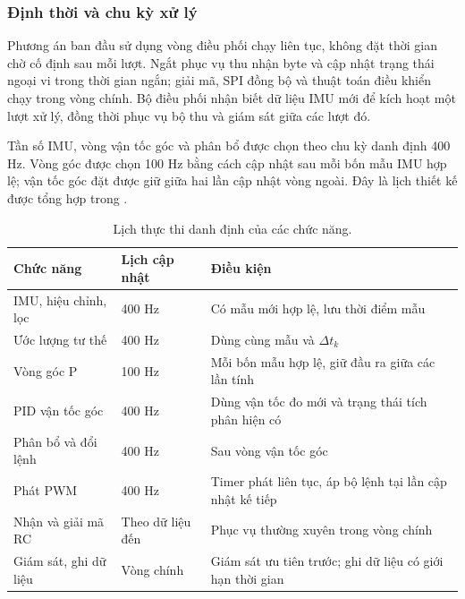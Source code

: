 \subsubsection{Định thời và chu kỳ xử lý}

Phương án ban đầu sử dụng vòng điều phối chạy liên tục, không đặt thời gian chờ cố định sau mỗi lượt. Ngắt phục vụ thu nhận byte và cập nhật trạng thái ngoại vi trong thời gian ngắn; giải mã, SPI đồng bộ và thuật toán điều khiển chạy trong vòng chính. Bộ điều phối nhận biết dữ liệu IMU mới để kích hoạt một lượt xử lý, đồng thời phục vụ bộ thu và giám sát giữa các lượt đó.

Tần số IMU, vòng vận tốc góc và phân bổ được chọn theo chu kỳ danh định 400 Hz. Vòng góc được chọn 100 Hz bằng cách cập nhật sau mỗi bốn mẫu IMU hợp lệ; vận tốc góc đặt được giữ giữa hai lần cập nhật vòng ngoài. Đây là lịch thiết kế được tổng hợp trong .

\begin{table}[htbp]
	\centering
	\caption{Lịch thực thi danh định của các chức năng.}
	\label{tab:design-task-timing}
	\begin{tabularx}{\linewidth}{|C{3.6cm}|C{2.5cm}|Y|}
		\hline
		\textbf{Chức năng}    & \textbf{Lịch cập nhật} & \textbf{Điều kiện}                                        \\
		\hline
		IMU, hiệu chỉnh, lọc  & 400 Hz                 & Có mẫu mới hợp lệ, lưu thời điểm mẫu                      \\
		\hline
		Ước lượng tư thế      & 400 Hz                 & Dùng cùng mẫu và $\Delta t_k$                             \\
		\hline
		Vòng góc P            & 100 Hz                 & Mỗi bốn mẫu hợp lệ, giữ đầu ra giữa các lần tính          \\
		\hline
		PID vận tốc góc       & 400 Hz                 & Dùng vận tốc đo mới và trạng thái tích phân hiện có       \\
		\hline
		Phân bổ và đổi lệnh   & 400 Hz                 & Sau vòng vận tốc góc                                      \\
		\hline
		Phát PWM              & 400 Hz                 & Timer phát liên tục, áp bộ lệnh tại lần cập nhật kế tiếp  \\
		\hline
		Nhận và giải mã RC    & Theo dữ liệu đến       & Phục vụ thường xuyên trong vòng chính                     \\
		\hline
		Giám sát, ghi dữ liệu & Vòng chính             & Giám sát ưu tiên trước; ghi dữ liệu có giới hạn thời gian \\
		\hline
	\end{tabularx}
\end{table}

